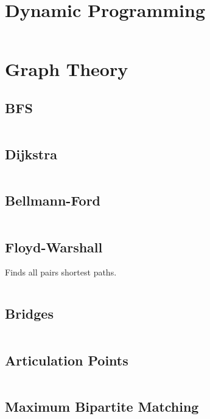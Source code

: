 \documentclass[8pt,a4paper,landscape,oneside]{amsart}
\newcommand{\code}[1]{\inputminted[fontsize=\normalsize,baselinestretch=1]{cpp}{_code/#1}}
\begin{document}
\begin{multicols*}{3}
	\code{data-structures/suffix_automaton.cpp}
	
\section{Dynamic Programming}

	\code{dynamic-programming/longest_increasing_subsequence.cpp}

\section{Graph Theory}

	\subsection{BFS}

	\code{graphs/bfs.cpp}

	\subsection{Dijkstra}
	
	\code{graphs/dijkstra.cpp}

	\subsection{Bellmann-Ford}

	\code{graphs/bellman_ford.cpp}

	\subsection{Floyd-Warshall}
	
	Finds all pairs shortest paths.
	
	\code{graphs/floyd_warshall.cpp}
	
	\subsection{Bridges}
	
	\code{graphs/bridges.cpp}
	
	\subsection{Articulation Points}
	
	\code{graphs/articulation_points.cpp}

	\subsection{Maximum Bipartite Matching}
	

\end{multicols*}
\end{document}
